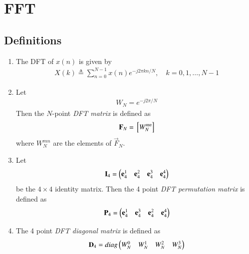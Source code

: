 \documentclass[journal,12pt,twocolumn]{IEEEtran}
\renewcommand\thesection{\arabic{section}}
\begin{document}
\section{FFT}
 \subsection{Definitions}
\begin{enumerate}[label=\arabic*.,ref=\thesection.\theenumi]
    \item The DFT of $x(n)$ is given by
    \begin{align}
        X(k) \triangleq \sum_{n=0}^{N-1} x(n) e^{-j 2 \pi k n / N}, \quad k=0,1, \ldots, N-1
    \end{align}
\item Let 
	\begin{align}
W_{N} = e^{-j2\pi/N} 
	\end{align}
		Then the $N$-point {\em DFT matrix} is defined as 
	\begin{align}
		\textbf{F}_{N} = {}\left[W_{N}^{mn}\right]
	\end{align}
	where $W_{N}^{mn}$ are the elements of $\vec{F}_{N}$.
\item Let 
	\begin{align}
		\textbf{I}_4 = \begin{pmatrix}\textbf{e}_4^{1} &\textbf{e}_4^{2} &\textbf{e}_4^{3} &\textbf{e}_4^{4} \end{pmatrix}
	\end{align}
		be the $4\times 4$ identity matrix.  Then the 4 point {\em DFT permutation matrix} is defined as 
	\begin{align}
		\textbf{P}_4 = \begin{pmatrix}\textbf{e}_4^{1} &\textbf{e}_4^{3} &\textbf{e}_4^{2} &\textbf{e}_4^{4} \end{pmatrix}
	\end{align}
\item The 4 point {\em DFT diagonal matrix} is defined as 
	\begin{align}
		\textbf{D}_4 = diag\begin{pmatrix}W_{N}^{0} & W_{N}^{1} & W_{N}^{2} & W_{N}^{3}\end{pmatrix}
	\end{align}
 \end{enumerate}
\end{document}
